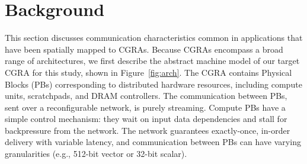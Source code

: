 \section{Background}
\label{sec:back}

This section discusses communication characteristics common in
applications that have been spatially mapped to CGRAs. %
Because CGRAs encompass a broad range of architectures, we first describe the abstract machine model
of our target CGRA for this study, shown in  Figure~\ref{fig:arch}.
The CGRA contains Physical Blocks (PBs) corresponding to distributed hardware resources, including compute units, scratchpads, and DRAM controllers.
The communication between PBs, sent over a reconfigurable network, is purely streaming.
Compute PBs have a simple control mechanism: they wait on input data dependencies and stall for backpressure from the network. 
The network guarantees exactly-once, in-order delivery with variable latency, and communication between PBs can have varying granularities (e.g., 512-bit vector or 32-bit scalar).


